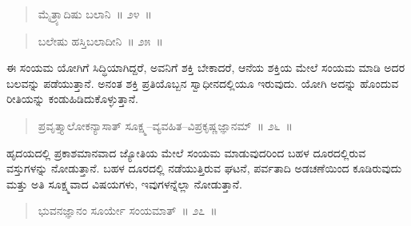 \vspace{-0.3cm}

\begin{verse}
ಮೈತ್ರ್ಯಾದಿಷು ಬಲಾನಿ~॥ ೨೪~॥
\end{verse}

\vspace{-0.4cm}


\vspace{-0.2cm}

\begin{verse}
ಬಲೇಷು ಹಸ್ತಿಬಲಾದೀನಿ~॥ ೨೫~॥
\end{verse}

\vspace{-0.4cm}


\vspace{0.1cm}

ಈ ಸಂಯಮ ಯೋಗಿಗೆ ಸಿದ್ಧಿಯಾಗಿದ್ದರೆ, ಅವನಿಗೆ ಶಕ್ತಿ ಬೇಕಾದರೆ, ಆನೆಯ ಶಕ್ತಿಯ ಮೇಲೆ ಸಂಯಮ ಮಾಡಿ ಅದರ ಬಲವನ್ನು ಪಡೆಯುತ್ತಾನೆ. ಅನಂತ ಶಕ್ತಿ ಪ್ರತಿಯೊಬ್ಬನ ಸ್ವಾಧೀನದಲ್ಲಿಯೂ ಇರುವುದು. ಯೋಗಿ ಅದನ್ನು ಹೊಂದುವ ರೀತಿಯನ್ನು ಕಂಡುಹಿಡಿದುಕೊಳ್ಳುತ್ತಾನೆ. 

\vspace{-0.2cm}

\begin{verse}
ಪ್ರವೃತ್ತ್ಯಾಲೋಕನ್ಯಾಸಾತ್​ ಸೂಕ್ಷ್ಮ–ವ್ಯವಹಿತ–ವಿಪ್ರಕೃಷ್ಣಜ್ಞಾನಮ್​~॥ ೨೬~॥
\end{verse}

\vspace{-0.4cm}


\vspace{0.1cm}

ಹೃದಯದಲ್ಲಿ ಪ್ರಕಾಶಮಾನವಾದ ಜ್ಯೋತಿಯ ಮೇಲೆ ಸಂಯಮ ಮಾಡುವುದರಿಂದ ಬಹಳ ದೂರದಲ್ಲಿರುವ ವಸ್ತುಗಳನ್ನು ನೋಡುತ್ತಾನೆ. ಬಹಳ ದೂರದಲ್ಲಿ ನಡೆಯುತ್ತಿರುವ ಘಟನೆ, ಪರ್ವತಾದಿ ಅಡಚಣೆಯಿಂದ ಕೂಡಿರುವುದು ಮತ್ತು ಅತಿ ಸೂಕ್ಷ್ಮವಾದ ವಿಷಯಗಳು, ಇವುಗಳನ್ನೆಲ್ಲಾ ನೋಡುತ್ತಾನೆ. 

\vspace{-0.2cm}

\begin{verse}
ಭುವನಜ್ಞಾನಂ ಸೂರ್ಯೇ ಸಂಯಮಾತ್​~॥ ೨೭~॥
\end{verse}

\vspace{-0.4cm}

